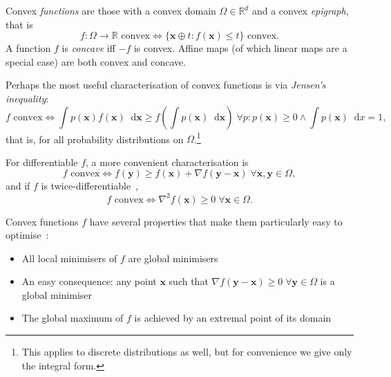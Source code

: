 \documentclass[10pt, a4paper]{article}
\numberwithin{equation}{section} %
\theoremstyle{definition}
\theoremstyle{plain}
\newcommand{\dif}{\mathop{}\!\mathrm{d}} %
\newcommand{\?}{\mathrel{?}} %
\newcommand{\R}{\mathbb{R}} %
\newcommand{\cvec}[1]{\boldsymbol{\mathbf{#1}}}    %
\begin{document}
\begin{appendices}
                    Convex \emph{functions} are those with a convex domain \(\Omega\in\R^d\) and a convex \emph{epigraph}, that is
                    \begin{equation}
                      f : \Omega \to \R \text{ convex} \Leftrightarrow \{\cvec{x} \oplus t : f(\cvec{x}) \leq t\}\text{ convex}. 
                    \end{equation}
                    A function \(f\) is \emph{concave} iff \(-f\) is convex. Affine maps (of which linear maps are a special case) are both convex and concave.

                    Perhaps the most useful characterisation of convex functions is via \emph{Jensen's inequality}:
                    \begin{equation}
                      f\text{ convex} \Leftrightarrow \int p(\cvec{x}) f(\cvec{x}) \dif{\cvec{x}} \geq f\left(\int p(\cvec{x}) \dif{\cvec{x}}\right)\;\forall p: p(\cvec{x}) \geq 0 \land \int p(\cvec{x}) \dif{x} = 1,
                    \end{equation}
                    that is, for all probability distributions on \(\Omega\).\footnote{This applies to discrete distributions as well, but for convenience we give only the integral form.}

                    For differentiable \(f\), a more convenient characterisation is~\cite[Ch. 7.4]{LuenbergerYe}
                    \begin{equation}
                      f\text{ convex} \Leftrightarrow f(\cvec{y}) \geq f(\cvec{x}) + \nabla{f}(\cvec{y}-\cvec{x}) \;\forall \cvec{x},\cvec{y} \in \Omega,
                    \end{equation}
                    and if \(f\) is twice-differentiable~\cite[Ch. 7.4]{LuenbergerYe},
                    \begin{equation}
                      f\text{ convex} \Leftrightarrow \nabla^2{f}(\cvec{x}) \geq 0 \;\forall \cvec{x} \in \Omega.
                    \end{equation}

                    Convex functions \(f\) have several properties that make them particularly easy to optimise~\cite[Ch. 7.5]{LuenbergerYe}:
                    \begin{itemize}
                      \item All local minimisers of \(f\) are global minimisers
                      \item An easy consequence: any point \(\cvec{x}\) such that \(\nabla{f}(\cvec{y}-\cvec{x}) \geq 0\;\forall \cvec{y}\in\Omega\) is a global minimiser
                      \item The global maximum of \(f\) is achieved by an extremal point of its domain
                    \end{itemize}


\end{appendices}
\end{document}
